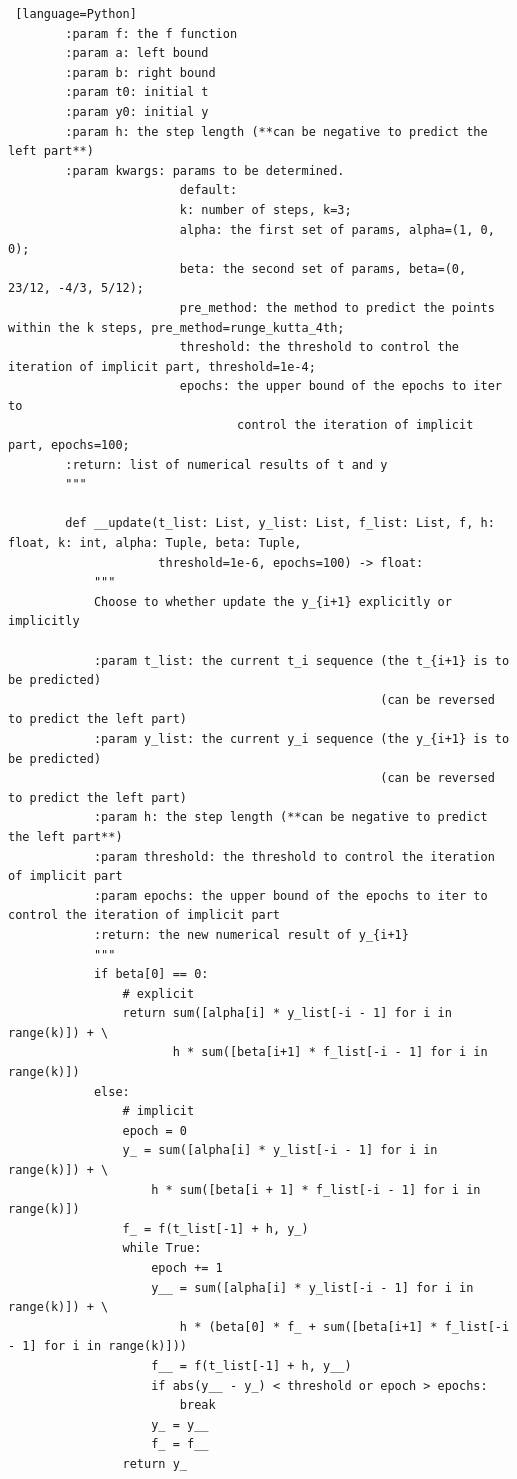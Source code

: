 \documentclass[a4paper]{article}
\begin{document}
\begin{appendices}
\begin{lstlisting} [language=Python]
        :param f: the f function
        :param a: left bound
        :param b: right bound
        :param t0: initial t
        :param y0: initial y
        :param h: the step length (**can be negative to predict the left part**)
        :param kwargs: params to be determined.
                        default:
                        k: number of steps, k=3;
                        alpha: the first set of params, alpha=(1, 0, 0);
                        beta: the second set of params, beta=(0, 23/12, -4/3, 5/12);
                        pre_method: the method to predict the points within the k steps, pre_method=runge_kutta_4th;
                        threshold: the threshold to control the iteration of implicit part, threshold=1e-4;
                        epochs: the upper bound of the epochs to iter to 
                                control the iteration of implicit part, epochs=100;
        :return: list of numerical results of t and y
        """
    
        def __update(t_list: List, y_list: List, f_list: List, f, h: float, k: int, alpha: Tuple, beta: Tuple,
                     threshold=1e-6, epochs=100) -> float:
            """
            Choose to whether update the y_{i+1} explicitly or implicitly
    
            :param t_list: the current t_i sequence (the t_{i+1} is to be predicted) 
                                                    (can be reversed to predict the left part)
            :param y_list: the current y_i sequence (the y_{i+1} is to be predicted) 
                                                    (can be reversed to predict the left part)
            :param h: the step length (**can be negative to predict the left part**)
            :param threshold: the threshold to control the iteration of implicit part
            :param epochs: the upper bound of the epochs to iter to control the iteration of implicit part
            :return: the new numerical result of y_{i+1}
            """
            if beta[0] == 0:
                # explicit
                return sum([alpha[i] * y_list[-i - 1] for i in range(k)]) + \
                       h * sum([beta[i+1] * f_list[-i - 1] for i in range(k)])
            else:
                # implicit
                epoch = 0
                y_ = sum([alpha[i] * y_list[-i - 1] for i in range(k)]) + \
                    h * sum([beta[i + 1] * f_list[-i - 1] for i in range(k)])
                f_ = f(t_list[-1] + h, y_)
                while True:
                    epoch += 1
                    y__ = sum([alpha[i] * y_list[-i - 1] for i in range(k)]) + \
                        h * (beta[0] * f_ + sum([beta[i+1] * f_list[-i - 1] for i in range(k)]))
                    f__ = f(t_list[-1] + h, y__)
                    if abs(y__ - y_) < threshold or epoch > epochs:
                        break
                    y_ = y__
                    f_ = f__
                return y_
    

\end{lstlisting}
\end{appendices}
\end{document}
